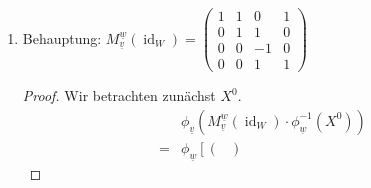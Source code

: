 \documentclass{article}
\newcommand{\id}{\operatorname{id}}
\begin{document}
\begin{enumerate}[(a)]
\begin{enumerate}[1.)]
\begin{proof}
\begin{align*}
                &= X^2
            \end{align*}
            Auch für $X^3$ erhalten wir das gewünschte Ergebnis
            \begin{align*}
                &\phi_{\underline{v}}(M_{\underline{v}}^{\underline{v}} (\partial) \cdot \phi_{\underline{v}}^{-1}(X^3))\\
                =&\phi_{\underline{v}}
                    \left[
                    \begin{pmatrix}
                        1 & -1 & -2 & -1\\
                        0 & 1 & 1 & 0\\
                        0 & 0 & -1 & 0\\
                        0 & 0 & 1 & 1
                    \end{pmatrix} \cdot 
                    \begin{pmatrix}0 \\ 0 \\ 0 \\ 1\end{pmatrix}
                    \right]\\
                =&\phi_{\underline{v}}
                    \left[\begin{pmatrix}-1 \\ 0 \\ 0 \\ 1\end{pmatrix}\right]
                    = -X^0 + X^3 + X^0 = X^3
            \end{align*} 
        \end{proof}
        \item Behauptung: $M_{\underline{v}}^{\underline{w}} (\id_W) = 
        \begin{pmatrix}
            1 & 1 & 0 & 1\\
            0 & 1 & 1 & 0\\
            0 & 0 & -1 & 0\\
            0 & 0 & 1 & 1
        \end{pmatrix}$
        \begin{proof}
            Wir betrachten zunächst $X^0$.
            \begin{align*}
                &\phi_{\underline{v}}(M_{\underline{v}}^{\underline{w}} (\id_W) \cdot \phi_{\underline{w}}^{-1}(X^0))\\
                =&\phi_{\underline{w}}
                    \left[
                        \begin{pmatrix}

\end{pmatrix}
\end{align*}
\end{proof}
\end{enumerate}
\end{enumerate}
\end{document}
